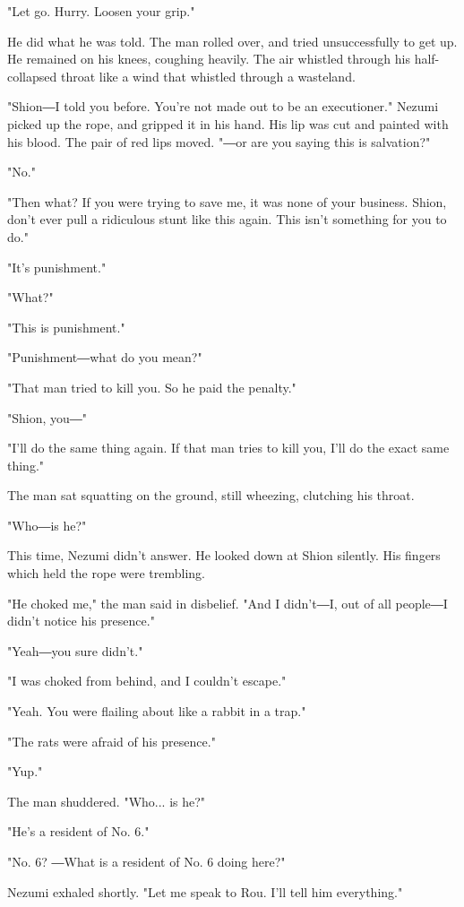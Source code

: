"Let go. Hurry. Loosen your grip."

He did what he was told. The man rolled over, and tried unsuccessfully
to get up. He remained on his knees, coughing heavily. The air whistled
through his half-collapsed throat like a wind that whistled through a
wasteland.

"Shion―I told you before. You're not made out to be an executioner."
Nezumi picked up the rope, and gripped it in his hand. His lip was cut
and painted with his blood. The pair of red lips moved. "―or are you
saying this is salvation?"

"No."

"Then what? If you were trying to save me, it was none of your business.
Shion, don't ever pull a ridiculous stunt like this again. This isn't
something for you to do."

"It's punishment."

"What?"

"This is punishment."

"Punishment―what do you mean?"

"That man tried to kill you. So he paid the penalty."

"Shion, you―"

"I'll do the same thing again. If that man tries to kill you, I'll do
the exact same thing."

The man sat squatting on the ground, still wheezing, clutching his
throat.

"Who―is he?"

This time, Nezumi didn't answer. He looked down at Shion silently. His
fingers which held the rope were trembling.

"He choked me," the man said in disbelief. "And I didn't―I, out of all
people―I didn't notice his presence."

"Yeah―you sure didn't."

"I was choked from behind, and I couldn't escape."

"Yeah. You were flailing about like a rabbit in a trap."

"The rats were afraid of his presence."

"Yup."

The man shuddered. "Who... is he?"

"He's a resident of No. 6."

"No. 6? ―What is a resident of No. 6 doing here?"

Nezumi exhaled shortly. "Let me speak to Rou. I'll tell him everything."

